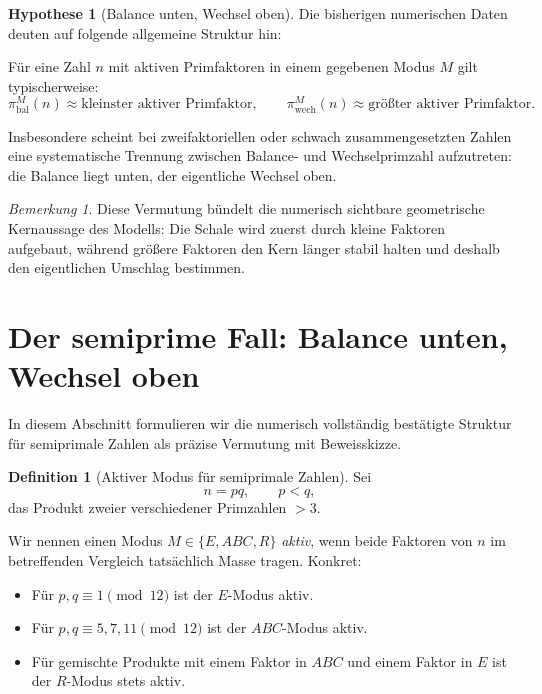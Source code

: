 \documentclass[11pt,a4paper]{article}
\theoremstyle{definition}
\newtheorem{definition}[satz]{Definition}
\newtheorem{hypothese}[satz]{Hypothese}
\theoremstyle{remark}
\newtheorem{bemerkung}[satz]{Bemerkung}
\begin{document}
	\begin{hypothese}[Balance unten, Wechsel oben]
		Die bisherigen numerischen Daten deuten auf folgende allgemeine Struktur hin:
		
		Für eine Zahl \(n\) mit aktiven Primfaktoren in einem gegebenen Modus \(M\) gilt
		typischerweise:
		\[
		\pi_{\mathrm{bal}}^{M}(n)\approx \text{kleinster aktiver Primfaktor},
		\qquad
		\pi_{\mathrm{wech}}^{M}(n)\approx \text{größter aktiver Primfaktor}.
		\]
		
		Insbesondere scheint bei zweifaktoriellen oder schwach zusammengesetzten Zahlen
		eine systematische Trennung zwischen Balance- und Wechselprimzahl aufzutreten:
		die Balance liegt unten, der eigentliche Wechsel oben.
	\end{hypothese}
	
	\begin{bemerkung}
		Diese Vermutung bündelt die numerisch sichtbare geometrische Kernaussage des Modells:
		Die Schale wird zuerst durch kleine Faktoren aufgebaut, während größere Faktoren
		den Kern länger stabil halten und deshalb den eigentlichen Umschlag bestimmen.
	\end{bemerkung}
	
	\section{Der semiprime Fall: Balance unten, Wechsel oben}
	
	In diesem Abschnitt formulieren wir die numerisch vollständig bestätigte Struktur
	für semiprimale Zahlen als präzise Vermutung mit Beweisskizze.
	
	\begin{definition}[Aktiver Modus für semiprimale Zahlen]
		Sei
		\[
		n=pq,\qquad p<q,
		\]
		das Produkt zweier verschiedener Primzahlen \(>3\).
		
		Wir nennen einen Modus \(M\in\{E,ABC,R\}\) \emph{aktiv}, wenn beide Faktoren von \(n\)
		im betreffenden Vergleich tatsächlich Masse tragen. Konkret:
		
		\begin{itemize}
			\item Für \(p,q\equiv 1\pmod{12}\) ist der \(E\)-Modus aktiv.
			\item Für \(p,q\equiv 5,7,11\pmod{12}\) ist der \(ABC\)-Modus aktiv.
			\item Für gemischte Produkte mit einem Faktor in \(ABC\) und einem Faktor in \(E\)
			ist der \(R\)-Modus stets aktiv.
		\end{itemize}
	\end{definition}
	
\end{document}
